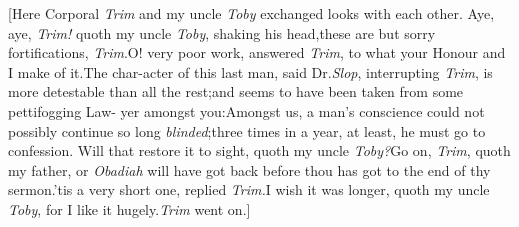 \documentclass{article}
\begin{document}
[Here Corporal \textit{Trim} and my uncle \textit{Toby} exchanged
looks with each other.\tsk\break
Aye, \tsk aye, \textit{Trim!} quoth my uncle \textit{Toby}, shaking
his head,\tsh these are but sorry fortifications,
\textit{Trim}.\tsh O! very poor work, answered \textit{Trim}, to
what your Honour and I make of it.\tsh The char-\break acter of this
last man, said Dr.\@ \textit{Slop}, interrupting \textit{Trim},
is more detestable than\break
all the rest;\tsh and seems to have\break
been taken from some pettifogging Law-\break
yer amongst you:\tsk Amongst us, a\break
man’s conscience could not possibly continue so long
\textit{blinded};\tsk three times in\pb
a year, at least, he must go to confession. Will that restore it
to sight, quoth my uncle
\textit{Toby?}\tsk Go on, \textit{Trim}, quoth my father, or
\textit{Obadiah} will have got back before thou has got to the
end of thy sermon.\tsh ’tis a very short one, replied
\textit{Trim.}\tsk I wish it was longer, quoth my uncle
\textit{Toby}, for I like it hugely.\tsk \textit{Trim} went on.]
\end{document}
